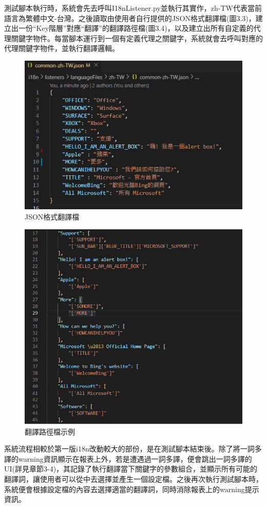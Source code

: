 測試腳本執行時，系統會先去呼叫I18nListener.py並執行其實作，zh-TW代表當前語言為繁體中文-台灣。之後讀取由使用者自行提供的JSON格式翻譯檔(圖3.3)，建立出一份“Key階層”對應“翻譯”的翻譯路徑檔(圖3.4)，以及建立出所有自定義的代理關鍵字物件。每當腳本運行到一個有定義代理之關鍵字，系統就會去呼叫對應的代理關鍵字物件，並執行翻譯邏輯。

\begin{figure}[H]
\centering
\includegraphics[width= .8\textwidth]{../論文截圖/3-1-3-2 JSON格式翻譯檔.png}
\caption{JSON格式翻譯檔}
\end{figure}
\begin{figure}[H]
\centering
\includegraphics[width= .8\textwidth]{../論文截圖/3-1-3-3 翻譯路徑檔.png}
\caption{翻譯路徑檔示例}
\end{figure}

系統流程相較於第一版i18n改動較大的部份，是在測試腳本結束後。除了將一詞多譯的warning資訊顯示在報表上外，若是遭遇過一詞多譯，便會跳出一詞多譯的UI(詳見章節3-4)，其記錄了執行翻譯當下關鍵字的參數組合，並顯示所有可能的翻譯詞，讓使用者可以從中去選擇並產生一個設定檔。之後再次執行測試腳本時，系統便會根據設定檔的內容去選擇適當的翻譯詞，同時消除報表上的warning提示資訊。

